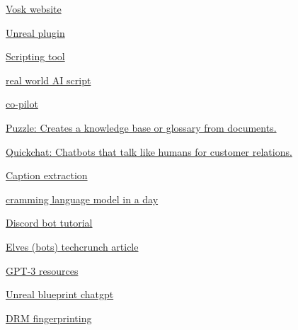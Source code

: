              \href{https://alphacephei.com/vosk/server}{Vosk website}
             
              \href{https://www.unrealengine.com/marketplace/en-US/product/offline-speech-recognition}{Unreal
              plugin}
             
           
         
          \href{https://deepmind.github.io/dramatron/}{Scripting tool}

           
          \tightlist
           
            \href{https://stephenfollows.com/how-we-got-hired-to-create-an-ai-generated-feature-film-screenplay/}{real
            world AI script}
           
         
          \href{https://thakkarparth007.github.io/copilot-explorer/posts/copilot-internals.html}{co-pilot}
         
          \href{https://www.puzzlelabs.ai/}{Puzzle: Creates a knowledge
          base or glossary from documents.}
         
          \href{https://www.quickchat.ai/}{Quickchat: Chatbots that talk
          like humans for customer relations.}
         
       
        \href{https://simonwillison.net/2022/Sep/30/action-transcription/}{Caption
        extraction}
       
        \href{https://arxiv.org/abs/2212.14034}{cramming language model
        in a day}
       
        \href{https://nlpcloud.com/build-gpt-j-gpt-neox-discord-chatbot-with-nlpcloud.html}{Discord
        bot tutorial}
       
        \href{https://techcrunch.com/2022/01/12/the-metaverse-will-be-filled-with-elves/}{Elves
        (bots) techcrunch article}
       
        \href{https://www.linkedin.com/feed/update/urn:li:activity:7005874144621809666/}{GPT-3
        resources}

         
        \tightlist
         
          \href{https://80-lv.cdn.ampproject.org/c/s/80.lv/articles/step-by-step-instruction-on-unreal-s-blueprints-generated-with-chatgpt/?amp=1}{Unreal
          blueprint chatgpt}
         
          \href{https://www.newscientist.com/article/2350655-openai-is-developing-a-watermark-to-identify-work-from-its-gpt-text-ai/}{DRM
          fingerprinting}
         
